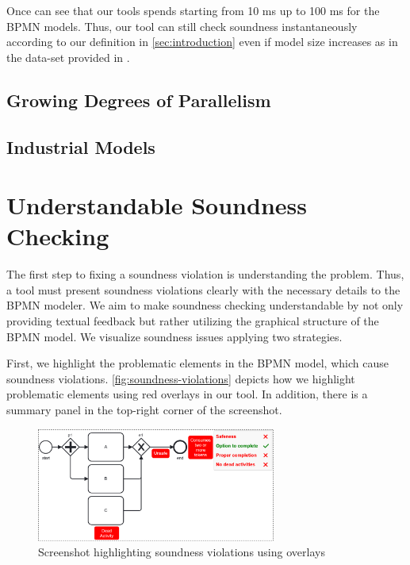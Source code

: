 \documentclass[runningheads]{llncs}
\begin{document}
Once can see that our tools spends starting from 10 ms up to 100 ms for the BPMN models.
Thus, our tool can still check soundness instantaneously according to our definition in \autoref{sec:introduction} even if model size increases as in the data-set provided in \cite{krauterHigherorderTransformationApproach2023}.

\subsection{Growing Degrees of Parallelism} \label{subsec:degrees-of-parallelism}

\subsection{Industrial Models} \label{subsec:industrial-models}

\section{Understandable Soundness Checking}

The first step to fixing a soundness violation is understanding the problem.
Thus, a tool must present soundness violations clearly with the necessary details to the BPMN modeler.
We aim to make soundness checking understandable by not only providing textual feedback but rather utilizing the graphical structure of the BPMN model.
We visualize soundness issues applying two strategies.

First, we highlight the problematic elements in the BPMN model, which cause soundness violations.
\autoref{fig:soundness-violations} depicts how we highlight problematic elements using red overlays in our tool.
In addition, there is a summary panel in the top-right corner of the screenshot.

\begin{figure}[ht]
	\centering
	\includegraphics[width=0.7\textwidth]{images/violations}
	\caption{Screenshot highlighting soundness violations using overlays}
	\label{fig:soundness-violations}
\end{figure}
\end{document}

